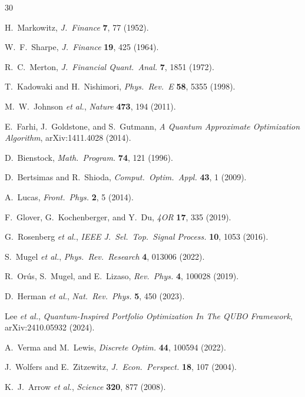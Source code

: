\documentclass[aps, reprint, prl, twocolumn, superscriptaddress,amsmath,amssymb,noeprint]{revtex4-2}
\begin{document}
\begin{thebibliography}{30}

H.~Markowitz, \emph{J.\ Finance} \textbf{7}, 77 (1952).

W.~F.~Sharpe, \emph{J.\ Finance} \textbf{19}, 425 (1964).

R.~C.~Merton, \emph{J.\ Financial Quant.\ Anal.} \textbf{7}, 1851 (1972).

T.~Kadowaki and H.~Nishimori, \emph{Phys.\ Rev.\ E} \textbf{58}, 5355 (1998).

M.~W.~Johnson \emph{et al.}, \emph{Nature} \textbf{473}, 194 (2011).

E.~Farhi, J.~Goldstone, and S.~Gutmann, \emph{A Quantum Approximate
Optimization Algorithm}, arXiv:1411.4028 (2014).

D.~Bienstock, \emph{Math.\ Program.} \textbf{74}, 121 (1996).

D.~Bertsimas and R.~Shioda, \emph{Comput.\ Optim.\ Appl.} \textbf{43}, 1 (2009).

A.~Lucas, \emph{Front.\ Phys.} \textbf{2}, 5 (2014).

F.~Glover, G.~Kochenberger, and Y.~Du, \emph{4OR} \textbf{17}, 335 (2019).


G.~Rosenberg \emph{et al.}, \emph{IEEE J.\ Sel.\ Top.\ Signal Process.}
\textbf{10}, 1053 (2016).

S.~Mugel \emph{et al.}, \emph{Phys.\ Rev.\ Research} \textbf{4}, 013006 (2022).

R.~Or\'{u}s, S.~Mugel, and E.~Lizaso, \emph{Rev.\ Phys.} \textbf{4}, 100028
(2019).

D.~Herman \emph{et al.}, \emph{Nat.\ Rev.\ Phys.} \textbf{5}, 450 (2023).

Lee \textit{et al.}, \emph{Quantum-Inspired Portfolio Optimization In The QUBO
Framework}, arXiv:2410.05932 (2024).

A.~Verma and M.~Lewis, \emph{Discrete Optim.} \textbf{44}, 100594 (2022).

J.~Wolfers and E.~Zitzewitz, \emph{J.\ Econ.\ Perspect.} \textbf{18}, 107
(2004).

K.~J.~Arrow \emph{et al.}, \emph{Science} \textbf{320}, 877 (2008).


\end{thebibliography}
\end{document}
